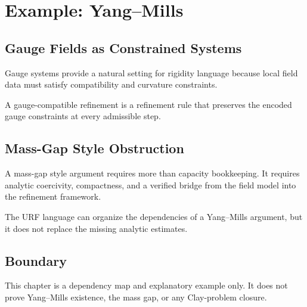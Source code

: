 \chapter{Example: Yang--Mills}

\section{Gauge Fields as Constrained Systems}

Gauge systems provide a natural setting for rigidity language because local field data must satisfy compatibility and curvature constraints.

\begin{definition}
A gauge-compatible refinement is a refinement rule that preserves the encoded gauge constraints at every admissible step.
\end{definition}

\section{Mass-Gap Style Obstruction}

A mass-gap style argument requires more than capacity bookkeeping.  It requires analytic coercivity, compactness, and a verified bridge from the field model into the refinement framework.

\begin{remark}
The URF language can organize the dependencies of a Yang--Mills argument, but it does not replace the missing analytic estimates.
\end{remark}

\section{Boundary}

This chapter is a dependency map and explanatory example only.  It does not prove Yang--Mills existence, the mass gap, or any Clay-problem closure.
